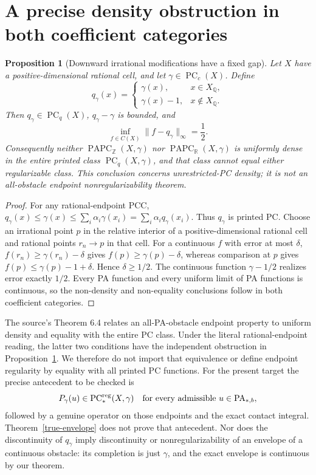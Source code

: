 \documentclass[11pt]{article}
\newtheorem{proposition}[theorem]{Proposition}
\newcommand{\R}{\mathbb R}
\newcommand{\Q}{\mathbb Q}
\newcommand{\Z}{\mathbb Z}
\newcommand{\PC}{\operatorname{PC}}
\newcommand{\PA}{\operatorname{PA}}
\newcommand{\PAPC}{\operatorname{PAPC}}
\begin{document}
\section{A precise density obstruction in both coefficient categories}
\begin{proposition}[Downward irrational modifications have a fixed gap]\label{gap}
Let $X$ have a positive-dimensional rational cell, and let $\gamma\in\PC_c(X)$. Define
\[q_\gamma(x)=\begin{cases}\gamma(x),&x\in X_\Q,\\\gamma(x)-1,&x\notin X_\Q.\end{cases}\]
Then $q_\gamma\in\PC_q(X)$, $q_\gamma-\gamma$ is bounded, and
\begin{equation}\label{half-gap}
 \inf_{f\in C(X)}\|f-q_\gamma\|_\infty=\frac12.
\end{equation}
Consequently neither $\PAPC_\Z(X,\gamma)$ nor $\PAPC_\R(X,\gamma)$ is uniformly dense in the entire printed class $\PC_q(X,\gamma)$, and that class cannot equal either regularizable class. This conclusion concerns unrestricted-PC density; it is not an all-obstacle endpoint nonregularizability theorem.
\end{proposition}
\begin{proof}
For any rational-endpoint PCC, $q_\gamma(x)\leq\gamma(x)\leq\sum_i\alpha_i\gamma(x_i)=\sum_i\alpha_i q_\gamma(x_i)$. Thus $q_\gamma$ is printed PC. Choose an irrational point $p$ in the relative interior of a positive-dimensional rational cell and rational points $r_n\to p$ in that cell. For a continuous $f$ with error at most $\delta$, $f(r_n)\geq\gamma(r_n)-\delta$ gives $f(p)\geq\gamma(p)-\delta$, whereas comparison at $p$ gives $f(p)\leq\gamma(p)-1+\delta$. Hence $\delta\geq1/2$. The continuous function $\gamma-1/2$ realizes error exactly $1/2$. Every PA function and every uniform limit of PA functions is continuous, so the non-density and non-equality conclusions follow in both coefficient categories.
\end{proof}

The source's Theorem 6.4 relates an all-PA-obstacle endpoint property to uniform density and equality with the entire PC class. Under the literal rational-endpoint reading, the latter two conditions have the independent obstruction in Proposition~\ref{gap}. We therefore do not import that equivalence or define endpoint regularity by equality with all printed PC functions. For the present target the precise antecedent to be checked is
\[P_\gamma(u)\in\PC^{\rm reg}_*(X,\gamma)\quad\text{for every admissible }u\in\PA_{*,b},\]
followed by a genuine operator on those endpoints and the exact contact integral. Theorem~\ref{true-envelope} does not prove that antecedent. Nor does the discontinuity of $q_\gamma$ imply discontinuity or nonregularizability of an envelope of a continuous obstacle: its completion is just $\gamma$, and the exact envelope is continuous by our theorem.
\end{document}
